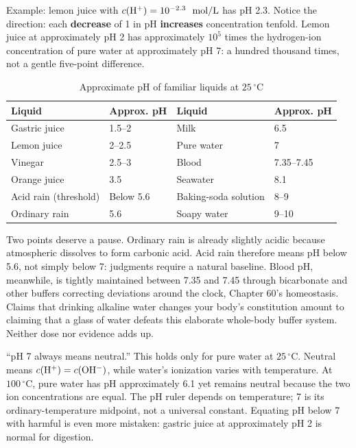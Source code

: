 Example: lemon juice with $c(\mathrm{H^+}) = 10^{-2.3}\ \ \mathrm{mol/L}$ has pH 2.3. Notice the direction: each \textbf{decrease} of 1 in pH \textbf{increases}  concentration tenfold. Lemon juice at approximately pH 2 has approximately $10^5$ times the hydrogen-ion concentration of pure water at approximately pH 7: a hundred thousand times, not a gentle five-point difference.

\begin{table}[htbp]
\centering
\caption{Approximate pH of familiar liquids at $25\,^{\circ}\mathrm{C}$}
\begin{tabular}{llll}
\toprule
Liquid & Approx. pH & Liquid & Approx. pH \\
\midrule
Gastric juice & 1.5--2 & Milk & 6.5 \\
Lemon juice & 2--2.5 & Pure water & 7 \\
Vinegar & 2.5--3 & Blood & 7.35--7.45 \\
Orange juice & 3.5 & Seawater & 8.1 \\
Acid rain (threshold) & Below 5.6 & Baking-soda solution & 8--9 \\
Ordinary rain & 5.6 & Soapy water & 9--10 \\
\bottomrule
\end{tabular}
\end{table}

Two points deserve a pause. Ordinary rain is already slightly acidic because atmospheric  dissolves to form carbonic acid. Acid rain therefore means pH below 5.6, not simply below 7: judgments require a natural baseline. Blood pH, meanwhile, is tightly maintained between 7.35 and 7.45 through bicarbonate and other buffers correcting deviations around the clock, Chapter 60's homeostasis. Claims that drinking alkaline water changes your body's constitution amount to claiming that a glass of water defeats this elaborate whole-body buffer system. Neither dose nor evidence adds up.

\begin{wuqu}
``pH 7 always means neutral.'' This holds only for pure water at $25\,^{\circ}\mathrm{C}$. Neutral means $c(\mathrm{H^+}) = c(\mathrm{OH^-})$, while water's ionization varies with temperature. At $100\,^{\circ}\mathrm{C}$, pure water has pH approximately 6.1 yet remains neutral because the two ion concentrations are equal. The pH ruler depends on temperature; 7 is its ordinary-temperature midpoint, not a universal constant. Equating pH below 7 with harmful is even more mistaken: gastric juice at approximately pH 2 is normal for digestion.
\end{wuqu}

